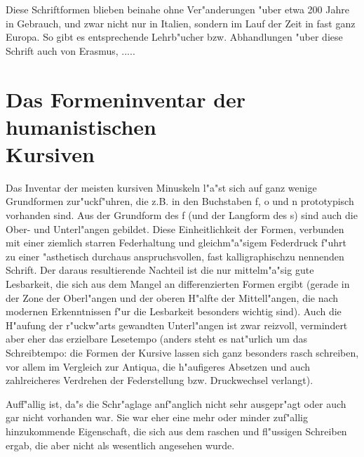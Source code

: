 \documentclass[draft,12pt,a4paper,german]{article}
\begin{document}
Diese Schriftformen blieben beinahe ohne Ver"anderungen "uber etwa 200 Jahre
in Gebrauch, und zwar nicht nur in Italien, sondern im Lauf der Zeit in fast
ganz Europa. So gibt es entsprechende Lehrb"ucher bzw. Abhandlungen "uber
diese Schrift auch von Erasmus, .....


\section{Das Formeninventar der humanistischen\\Kursiven}

Das Inventar der meisten kursiven Minuskeln l"a"st sich auf ganz wenige
Grundformen zur"uckf"uhren, die z.B. in den Buchstaben f, o und n prototypisch
vorhanden sind. Aus der Grundform des f (und der Langform des s) sind auch
die Ober- und Unterl"angen gebildet. Diese Einheitlichkeit der Formen,
verbunden mit einer ziemlich starren Federhaltung und gleichm"a"sigem
Federdruck f"uhrt zu einer "asthetisch durchaus anspruchsvollen, fast
\glqq kalligraphisch\grqq  zu nennenden Schrift. Der daraus resultierende
Nachteil
ist die nur mittelm"a"sig gute Lesbarkeit, die sich aus dem Mangel an
differenzierten Formen ergibt (gerade in der Zone der Oberl"angen und der
oberen H"alfte der Mittell"angen, die nach modernen Erkenntnissen f"ur die
Lesbarkeit besonders wichtig sind). Auch die H"aufung der
\glqq r"uckw"arts\grqq 
gewandten Unterl"angen ist zwar reizvoll, vermindert aber eher das erzielbare
Lesetempo (anders steht es nat"urlich um das Schreibtempo: die Formen der
Kursive lassen sich ganz besonders rasch schreiben, vor allem im Vergleich
zur Antiqua, die h"aufigeres Absetzen und auch zahlreicheres Verdrehen der
Federstellung bzw. Druckwechsel verlangt).

Auff"allig ist, da"s die Schr"aglage anf"anglich nicht sehr ausgepr"agt oder
auch
gar nicht vorhanden war. Sie war eher eine mehr oder minder zuf"allig
hinzukommende Eigenschaft, die sich aus dem raschen und fl"ussigen Schreiben
ergab, die aber nicht als wesentlich angesehen wurde.
\end{document}

